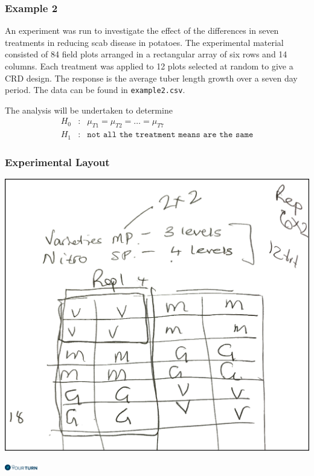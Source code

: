 \begin{frame}\frametitle{Example 2}
An experiment was run to investigate the effect of the differences in seven treatments in reducing scab disease in
potatoes. The experimental material consisted of 84 field plots arranged in a rectangular array of six rows and 14
columns. Each treatment was applied to 12 plots selected at random to give a CRD design. The response is the average
tuber length growth over a seven day period. The data can be found in \texttt{example2.csv}.


The analysis will be undertaken to determine
\begin{eqnarray*}
	H_0&:& \mu_{T1} = \mu_{T2} = \hdots = \mu_{T7} \\
	H_1&:& \texttt{not all the treatment means are the same}
\end{eqnarray*}
\end{frame}


\begin{frame}\frametitle{Experimental Layout}

\begin{center}
\includegraphics[height = 0.7\textheight]{exptlayout.png}
\end{center}
\flushright
\includegraphics[height = 0.3cm]{yourturn}
\end{frame}


